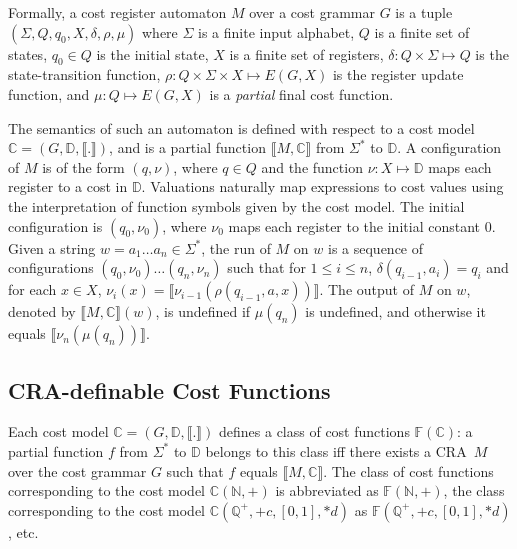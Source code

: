 \documentclass[11pt]{article}
\newcommand{\mypar}[1]{\subsection{#1}}
\newcommand{\domain}{\ensuremath{\mathbb{D}}}
\newcommand{\posrat}{\ensuremath{\mathbb{Q}^+}}
\newcommand{\Nat}{\ensuremath{\mathbb{N}}}
\newcommand{\CG}{G}
\newcommand{\CF}{{\mathbb F}}
\newcommand{\CostModel}{\ensuremath{\mathbb{C}}}
\newcommand{\inputalph}{\ensuremath{\Sigma}}
\newcommand{\fm}[1]{\ensuremath{#1^{*}}}
\newcommand{\valuation}{\ensuremath{\nu}}
\newcommand{\interp}[1]{\ensuremath{\llbracket #1\rrbracket}}
\newcommand{\computation}[1]{\ensuremath{\llbracket #1\rrbracket}}
\newcommand{\EDWA}{{CRA}\xspace}
\newcommand{\edwa}{\ensuremath{M}}
\newcommand{\edwastates}{\ensuremath{Q}}
\newcommand{\edwastate}{\ensuremath{q}}
\newcommand{\edwainitst}{\ensuremath{\edwastate_0}}
\newcommand{\edwavariables}{\ensuremath{X}}
\newcommand{\edwatrans}{\ensuremath{\delta}}
\newcommand{\edwavarup}{\ensuremath{\rho}}
\newcommand{\edwafinal}{\ensuremath{\mu}}
\newcommand{\edwavaluation}{\ensuremath{\nu}}
\newcommand{\edwaexpr}[1]{\ensuremath{E(#1)}}
\begin{document}
Formally, a cost register automaton $\edwa$ over a cost grammar $\CG$ is a tuple
$(\inputalph, \edwastates, \edwainitst, \edwavariables,
\edwatrans, \edwavarup, \edwafinal)$ where
$\inputalph$ is a finite input alphabet,
$\edwastates$ is a finite set of states,
$\edwainitst\in\edwastates$ is the initial state,
$\edwavariables$ is a finite set of registers,
$\edwatrans: \edwastates\times\inputalph\mapsto\edwastates$ is the state-transition function,
$\edwavarup: \edwastates\times\inputalph\times\edwavariables\mapsto\edwaexpr{\CG,\edwavariables}$
is the register update function, and
$\edwafinal : \edwastates \mapsto \edwaexpr{\CG,\edwavariables}$ is a {\em partial\/}
final cost function.

The semantics of such an automaton is defined with respect to a cost
model $\CostModel=(\CG, \domain, \interp{.})$, and is a partial
function $\computation{\edwa,\CostModel}$ from $\fm\inputalph$ to
$\domain$.  A configuration of $\edwa$ is of the form
$(\edwastate,\edwavaluation)$, where $\edwastate\in\edwastates$ and
the function $\valuation:\edwavariables\mapsto\domain$ maps each
register to a cost in $\domain$.  Valuations naturally map expressions
to cost values using the interpretation of function symbols given by
the cost model.  The initial configuration is
$(\edwainitst,\valuation_0)$, where $\valuation_0$ maps each register
to the initial constant $0$.  Given a string $w=a_1\ldots
a_n\in\fm\inputalph$, the run of $\edwa$ on $w$ is a sequence of
configurations $(\edwastate_0,\valuation_0)\ldots
(\edwastate_n,\valuation_n)$ such that for $1\le i \le n$,
$\edwatrans(\edwastate_{i-1},a_i)=\edwastate_{i}$ and for each $x \in
\edwavariables$, $\valuation_{i}(x) =
\interp{\valuation_{i-1}(\edwavarup(\edwastate_{i-1},a,x))}$.  The
output of $\edwa$ on $w$, denoted by
$\computation{\edwa,\CostModel}(w)$, is undefined if
$\edwafinal(\edwastate_n)$ is undefined, and otherwise it equals
$\interp{\valuation_n(\edwafinal(\edwastate_n))}$.

\mypar{CRA-definable Cost Functions}
Each cost model $\CostModel=(\CG, \domain, \interp{.})$ defines a
class of cost functions $\CF(\CostModel)$: a partial function $f$ from
$\fm\inputalph$ to $\domain$ belongs to this class iff there exists a
\EDWA\ $\edwa$ over the cost grammar $\CG$ such that $f$ equals
$\computation{\edwa,\CostModel}$.  The class of cost functions
corresponding to the cost model $\CostModel(\Nat,+)$ is abbreviated as
$\CF(\Nat,+)$, the class corresponding to the cost model
$\CostModel(\posrat,+c,[0,1],*d)$ as $\CF(\posrat,+c,[0,1],*d)$, etc.
\end{document}

